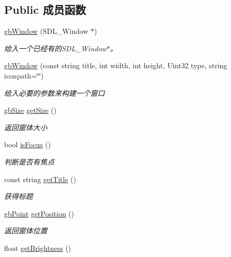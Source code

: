 \subsection*{Public 成员函数}
\begin{DoxyCompactItemize}
\item 
\mbox{\hyperlink{classgb_window_a08e5afeb1a8c049610b57be380b6403a}{gb\+Window}} (S\+D\+L\+\_\+\+Window $\ast$)
\begin{DoxyCompactList}\small\item\em 给入一个已经有的\+S\+D\+L\+\_\+\+Window$\ast$。 \end{DoxyCompactList}\item 
\mbox{\hyperlink{classgb_window_a47e8d87e8905b3e7a126d3b1f3bfe66d}{gb\+Window}} (const string title, int width, int height, Uint32 type, string iconpath=\char`\"{}\char`\"{})
\begin{DoxyCompactList}\small\item\em 给入必要的参数来构建一个窗口 \end{DoxyCompactList}\item 
\mbox{\hyperlink{classgb_size}{gb\+Size}} \mbox{\hyperlink{classgb_window_af329e62282ec4ed7184eb8c58d7f7809}{get\+Size}} ()
\begin{DoxyCompactList}\small\item\em 返回窗体大小 \end{DoxyCompactList}\item 
bool \mbox{\hyperlink{classgb_window_a2e2392232e1ddb4ee301dc8069ab6230}{is\+Focus}} ()
\begin{DoxyCompactList}\small\item\em 判断是否有焦点 \end{DoxyCompactList}\item 
const string \mbox{\hyperlink{classgb_window_a42dac83ea2862f0e5277eaf1df4bf740}{get\+Title}} ()
\begin{DoxyCompactList}\small\item\em 获得标题 \end{DoxyCompactList}\item 
\mbox{\hyperlink{classgb_point}{gb\+Point}} \mbox{\hyperlink{classgb_window_acf7f12b75b0b9b3f25105569f77e8f80}{get\+Position}} ()
\begin{DoxyCompactList}\small\item\em 返回窗体位置 \end{DoxyCompactList}\item 
float \mbox{\hyperlink{classgb_window_aa5a6dbbedb1b0421c5ce41753df71ba3}{get\+Brightness}} ()

\end{DoxyCompactItemize}
